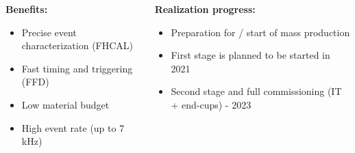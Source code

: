 \documentclass[dvipsnames] {beamer}
\begin{document}
\begin{frame}
\begin{columns}[t]
{\begin{block}{\bf \centering Benefits:}
\begin{itemize}
                            \item Precise event characterization (FHCAL)
                            \item Fast timing and triggering (FFD)
                            \item Low material budget
                            \item High event rate (up to 7 kHz) 
                            \end{itemize}
                          \end{block}
                        }
                        \vskip -0.3cm
                        \begin{block}{\bf \centering Realization progress:}
                          {\scriptsize
                            \begin{itemize}
                            \item Preparation for / start of mass production
                            \item First stage is planned to be started in {\color{red} 2021} 
                            \item Second stage and full commissioning (IT + end-cups) - {\color{red} 2023}
                            \end{itemize}
                          }
                          
                        \end{block}
        \end{columns}      
      \end{frame}
\end{document}
